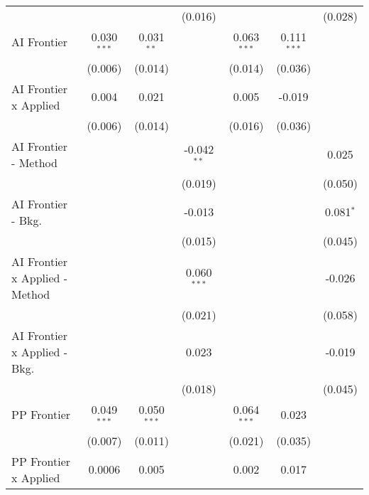 \begin{tabular}{lcccccc}
                                  &               &               & (0.016)       &               &               & (0.028)\\   
   AI Frontier                    & 0.030$^{***}$ & 0.031$^{**}$  &               & 0.063$^{***}$ & 0.111$^{***}$ &   \\   
                                  & (0.006)       & (0.014)       &               & (0.014)       & (0.036)       &   \\   
   AI Frontier x Applied          & 0.004         & 0.021         &               & 0.005         & -0.019        &   \\   
                                  & (0.006)       & (0.014)       &               & (0.016)       & (0.036)       &   \\   
   AI Frontier - Method           &               &               & -0.042$^{**}$ &               &               & 0.025\\   
                                  &               &               & (0.019)       &               &               & (0.050)\\   
   AI Frontier - Bkg.             &               &               & -0.013        &               &               & 0.081$^{*}$\\   
                                  &               &               & (0.015)       &               &               & (0.045)\\   
   AI Frontier x Applied - Method &               &               & 0.060$^{***}$ &               &               & -0.026\\   
                                  &               &               & (0.021)       &               &               & (0.058)\\   
   AI Frontier x Applied - Bkg.   &               &               & 0.023         &               &               & -0.019\\   
                                  &               &               & (0.018)       &               &               & (0.045)\\   
   PP Frontier                    & 0.049$^{***}$ & 0.050$^{***}$ &               & 0.064$^{***}$ & 0.023         &   \\   
                                  & (0.007)       & (0.011)       &               & (0.021)       & (0.035)       &   \\   
   PP Frontier x Applied          & 0.0006        & 0.005         &               & 0.002         & 0.017         &   \\   

\end{tabular}
